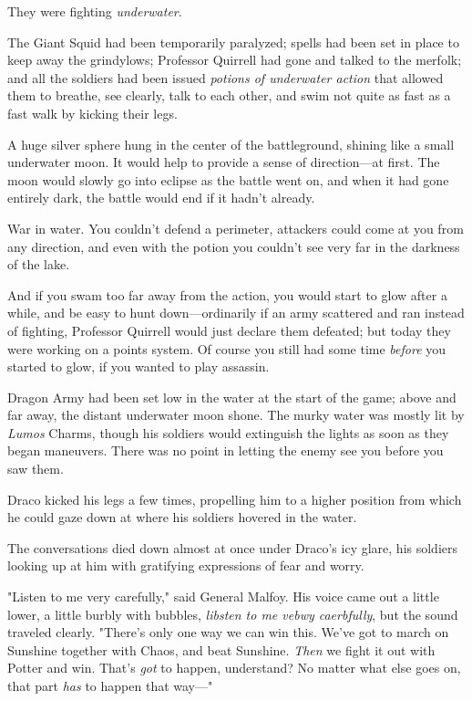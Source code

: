 They were fighting \emph{underwater}.

The Giant Squid had been temporarily paralyzed; spells had been set in place to 
keep away the grindylows; Professor Quirrell had gone and talked to the 
merfolk; and all the soldiers had been issued \emph{potions of underwater 
action} that allowed them to breathe, see clearly, talk to each other, and swim 
not quite as fast as a fast walk by kicking their legs.

A huge silver sphere hung in the center of the battleground, shining like a 
small underwater moon. It would help to provide a sense of direction---at 
first. The moon would slowly go into eclipse as the battle went on, and when it 
had gone entirely dark, the battle would end if it hadn't already.

War in water. You couldn't defend a perimeter, attackers could come at you from 
any direction, and even with the potion you couldn't see very far in the 
darkness of the lake.

And if you swam too far away from the action, you would start to glow after a 
while, and be easy to hunt down---ordinarily if an army scattered and ran 
instead of fighting, Professor Quirrell would just declare them defeated; but 
today they were working on a points system. Of course you still had some time 
\emph{before} you started to glow, if you wanted to play assassin.

Dragon Army had been set low in the water at the start of the game; above and 
far away, the distant underwater moon shone. The murky water was mostly lit by 
\emph{Lumos} Charms, though his soldiers would extinguish the lights as soon as 
they began maneuvers. There was no point in letting the enemy see you before 
you saw them.

Draco kicked his legs a few times, propelling him to a higher position from 
which he could gaze down at where his soldiers hovered in the water.

The conversations died down almost at once under Draco's icy glare, his 
soldiers looking up at him with gratifying expressions of fear and worry.

"Listen to me very carefully," said General Malfoy. His voice came out a little 
lower, a little burbly with bubbles, \emph{libsten to me vebwy caerbfully}, but 
the sound traveled clearly. "There's only one way we can win this. We've got to 
march on Sunshine together with Chaos, and beat Sunshine. \emph{Then} we fight 
it out with Potter and win. That's \emph{got} to happen, understand? No matter 
what else goes on, that part \emph{has} to happen that way---"

